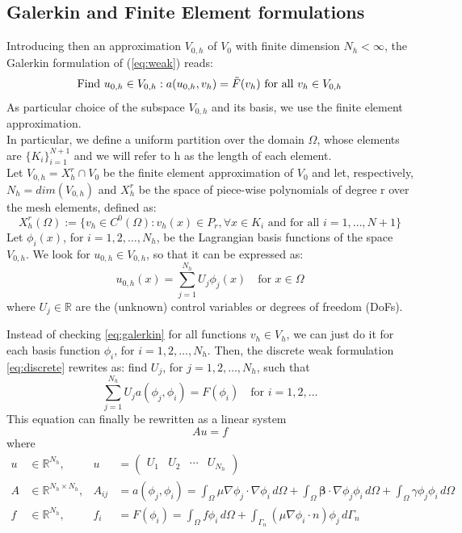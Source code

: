 \documentclass{article}
\begin{document}
\subsection{Galerkin and Finite Element formulations}
Introducing then an approximation $V_{0,h}$ of $V_0$ with finite dimension $N_h < \infty$, the Galerkin formulation of (\ref{eq:weak}) reads:
\begin{equation} \label{eq:galerkin}
    \text{Find } u_{0,h} \in V_{0,h} : a(u_{0,h}, v_h) = \Tilde{F}(v_h) \text{  for all } v_h \in V_{0,h}
\end{equation}
As particular choice of the subspace $V_{0,h}$ and its basis, we use the finite element approximation. 
\\In particular, we define a uniform partition over the domain $\Omega$, whose elements are $\{K_i\}_{i=1}^{N+1}$ and we will refer to h as the length of each element.
\\Let $V_{0,h} = X_h^r \cap V_0$ be the finite element approximation of $V_0$ and let, respectively, $N_h = dim(V_{0,h})$ and $X_h^r$ be the space of piece-wise polynomials of degree r over the mesh elements, defined as:
\begin{equation*}
    X_h^r(\Omega) := \{ v_h \in C^0(\Omega) : v_h(x) \in P_r, \forall x \in K_i \text{ and for all } i = 1, \ldots, N + 1 \}
\end{equation*}
Let $\phi_i(x)$, for $i = 1, 2, \ldots, N_h$, be the Lagrangian basis functions of the space $V_{0,h}$. We look for $u_{0,h} \in V_{0,h}$, so that it can be expressed as:
\begin{equation} \label{eq:discrete}
   u_{0,h}(x) = \sum_{j=1}^{N_h} U_j \phi_j(x) \quad \text{for } x \in \Omega 
\end{equation}
where $U_j \in \mathbb{R}$ are the (unknown) control variables or degrees of freedom (DoFs).

Instead of checking \eqref{eq:galerkin} for all functions $v_h \in V_h$, we can just do it for each basis function $\phi_i$, for $i = 1, 2, \ldots, N_h$. Then, the discrete weak formulation \eqref{eq:discrete} rewrites as: find $U_j$, for $j = 1, 2, \ldots, N_h$, such that
\begin{equation}
    \sum_{j=1}^{N_h} U_j a(\phi_j, \phi_i) = F(\phi_i) \quad \text{for } i = 1, 2, \ldots
\end{equation}
This equation can finally be rewritten as a linear system
\begin{equation}
    Au = f
\end{equation}
where
\begin{align*}
u &\in \mathbb{R} ^{N_h}, & u &= \begin{pmatrix} U_1 & U_2 & \cdots & U_{N_h} \end{pmatrix} \\
A &\in \mathbb{R} ^{N_h \times N_h},& A_{ij} &= a(\phi_j, \phi_i) = \int_{\Omega} \mu \nabla \phi_j \cdot \nabla \phi_i \,d{\Omega} + \int_{\Omega} \boldsymbol{\beta} \cdot \nabla \phi_j \phi_i \,d{\Omega} + \int_{\Omega} \gamma \phi_j \phi_i \, d{\Omega} \\
f &\in \mathbb{R}^{N_h},& f_i &= F(\phi_i) = \int_{\Omega} f \phi_i \,d{\Omega} + \int_{\Gamma_n} (\mu \nabla \phi_i \cdot n) \phi_j \,d{\Gamma_n}
\end{align*}
\end{document}
